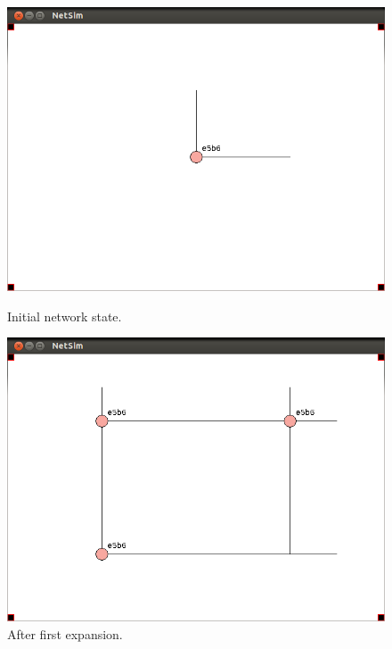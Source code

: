 \documentclass[ %
                    author={Luke Murray},
                supervisor={Dr. Simon Hollis},
                     title={Shadow Peer-to-Peer Networks},
                  subtitle={},
                    degree={MEng},
                      year={2013} ]{thesis}
\begin{document}
\begin{figure}[h]
    \centering
    \begin{minipage}[b]{0.45\linewidth}
        \centering
        \includegraphics[width=\linewidth]{sim_pics/expand_1.png}
        \caption{Initial network state.}
        \label{sim_expand1}
    \end{minipage}
    \hspace{0.5cm}
    \begin{minipage}[b]{0.45\linewidth}
        \centering
        \includegraphics[width=\linewidth]{sim_pics/expand_2.png}
        \caption{After first expansion.}
        \label{sim_expand2}
    \end{minipage}
    \begin{minipage}[b]{0.45\linewidth}

\end{minipage}
\end{figure}
\end{document}
